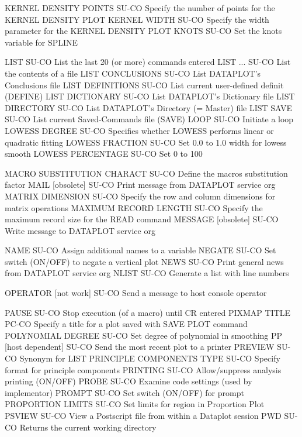 KERNEL DENSITY POINTS       SU-CO Specify the number of points for the KERNEL DENSITY PLOT
KERNEL WIDTH                SU-CO Specify the width parameter for the KERNEL DENSITY PLOT
KNOTS                       SU-CO Set the knots variable for SPLINE

LIST                        SU-CO List the last 20 (or more) commands entered
LIST ...                    SU-CO List the contents of a file
LIST CONCLUSIONS            SU-CO List DATAPLOT's Conclusions file
LIST DEFINITIONS            SU-CO List current user-defined definit (DEFINE)
LIST DICTIONARY             SU-CO List DATAPLOT's Dictionary file
LIST DIRECTORY              SU-CO List DATAPLOT's Directory (= Master) file
LIST SAVE                   SU-CO List current Saved-Commands file (SAVE)
LOOP                        SU-CO Initiate a loop
LOWESS DEGREE               SU-CO Specifies whether LOWESS performs linear or quadratic fitting
LOWESS FRACTION             SU-CO Set 0.0 to 1.0 width for lowess smooth
LOWESS PERCENTAGE           SU-CO Set 0 to 100%

MACRO SUBSTITUTION CHARACT  SU-CO Define the macros substitution factor
MAIL         [obsolete]     SU-CO Print message from DATAPLOT service org
MATRIX DIMENSION            SU-CO Specify the row and column dimensions for matrix operations
MAXIMUM RECORD LENGTH       SU-CO Specify the maximum record size for the READ command
MESSAGE      [obsolete]     SU-CO Write message to DATAPLOT service org

NAME                        SU-CO Assign additional names to a variable
NEGATE                      SU-CO Set switch (ON/OFF) to negate a vertical plot
NEWS                        SU-CO Print general news from DATAPLOT service org
NLIST                       SU-CO Generate a list with line numbers

OPERATOR     [not work]     SU-CO Send a message to host console operator

PAUSE                       SU-CO Stop execution (of a macro) until CR entered
PIXMAP TITLE                PC-CO Specify a title for a plot saved with SAVE PLOT command
POLYNOMIAL DEGREE           SU-CO Set degree of polynomial in smoothing
PP [host dependent]         SU-CO Send the most recent plot to a printer
PREVIEW                     SU-CO Synonym for LIST
PRINCIPLE COMPONENTS TYPE   SU-CO Specify format for principle components
PRINTING                    SU-CO Allow/suppress analysis printing (ON/OFF)
PROBE                       SU-CO Examine code settings (used by implementor)
PROMPT                      SU-CO Set switch (ON/OFF) for prompt
PROPORTION LIMITS           SU-CO Set limits for region in Proportion Plot
PSVIEW                      SU-CO View a Postscript file from within a Dataplot session
PWD                         SU-CO Returns the current working directory

